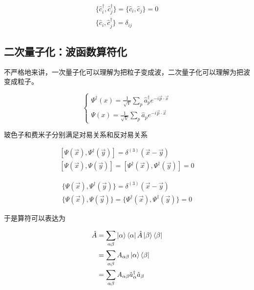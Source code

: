 \begin{equation}
    \begin{split}
        \{\hat{c}_i^\dagger,\hat{c}_j^\dagger\}=\{\hat{c}_i,\hat{c}_j\}=0 \\
        \{\hat{c}_i,\hat{c}_j^\dagger\}=\delta_{ij}
    \end{split}
\end{equation}



\subsection{二次量子化：波函数算符化}

不严格地来讲，一次量子化可以理解为把粒子变成波，二次量子化可以理解为把波变成粒子。

\begin{equation}
	\left\{
	\begin{array}{lr}
		\Psi^\dagger(x)=\frac{1}{\sqrt{V}}\sum_{p}\hat{a}_p^\dagger e^{-i\vec{p}\cdot\vec{x}} \\
		\Psi(x)=\frac{1}{\sqrt{V}}\sum_{p}\hat{a}_pe^{-i\vec{p}\cdot\vec{x}}
	\end{array}
	\right.
\end{equation}

玻色子和费米子分别满足对易关系和反对易关系

\begin{equation}
	\begin{split}
		[\Psi(\vec{x}),\Psi^\dagger(\vec{y})]=\delta^{(3)}(\vec{x}-\vec{y}) \\
		[\Psi(\vec{x}),\Psi(\vec{y})]=[\Psi^\dagger(\vec{x}),\Psi^\dagger(\vec{y})]=0
	\end{split}
\end{equation}

\begin{equation}
	\begin{array}{lr}
		\{\Psi(\vec{x}),\Psi^\dagger(\vec{y})\}=\delta^{(3)}(\vec{x}-\vec{y}) \\
		\{\Psi(\vec{x}),\Psi(\vec{y})\}=\{\Psi^\dagger(\vec{x}),\Psi^\dagger(\vec{y})\}=0
	\end{array}
\end{equation}

于是算符可以表达为

\begin{equation}
	\begin{split}
		\hat{A} &= \sum_{\alpha\beta}\ket{\alpha}\bra{\alpha}\hat{A}\ket{\beta}\bra{\beta} \\
			&= \sum_{\alpha\beta}A_{\alpha\beta}\ket{\alpha}\bra{\beta} \\
			&= \sum_{\alpha\beta}A_{\alpha\beta}\hat{a}_\alpha^\dagger\hat{a}_\beta
	\end{split}
\end{equation}

